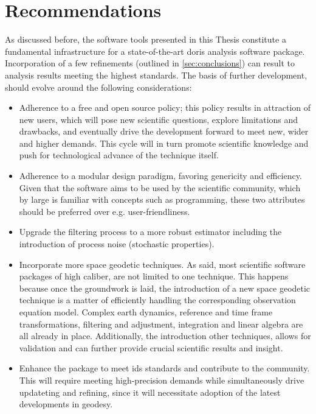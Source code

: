 \section{Recommendations}\label{sec:recommendations}

As discussed before, the software tools presented in this Thesis constitute a 
fundamental infrastructure for a state-of-the-art \gls{doris} analysis software 
package. Incorporation of a few refinements (outlined in \autoref{sec:conclusions}) 
can result to analysis results meeting the highest standards. The basis of further 
development, should evolve around the following considerations:
\begin{itemize}
  \item[] Adherence to a free and open source policy; this policy results in attraction 
    of new users, which will pose new scientific questions, explore limitations and 
    drawbacks, and eventually drive the development forward to meet new, wider and 
    higher demands. This cycle will in turn promote scientific knowledge and push 
    for technological advance of the technique itself.

  \item[] Adherence to a modular design paradigm, favoring genericity and efficiency. 
    Given that the software aims to be used by the scientific community, which by large is 
    familiar with concepts such as programming, these two attributes should be preferred 
    over e.g. user-friendliness.

  \item[] Upgrade the filtering process to a more robust estimator including the 
    introduction of process noise (stochastic properties).

  \item[] Incorporate more space geodetic techniques. As said, most scientific 
    software packages of high caliber, are not limited to one technique. This happens 
    because once the groundwork is laid, the introduction of a new space geodetic 
    technique is a matter of efficiently handling the corresponding observation 
    equation model. Complex earth dynamics, reference and time frame transformations, 
    filtering and adjustment, integration and linear algebra are all already in place. 
    Additionally, the introduction other techniques, allows for validation and 
    can further provide crucial scientific results and insight.

  \item[] Enhance the package to meet \gls{ids} standards and contribute to the 
    community. This will require meeting high-precision demands while simultaneously drive
    updateting and refining, since it will necessitate adoption of 
    the latest developments in geodesy.
\end{itemize}
